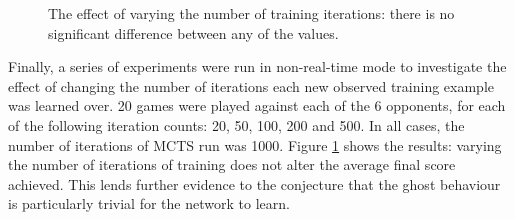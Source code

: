 \begin{figure}
\centering
{}
\caption[The effect of varying the number of training iterations]{The effect of varying the number of training iterations: there is no significant difference between any of the values.}
\label{fig:resultsiterations}
\end{figure}



Finally, a series of experiments were run in non-real-time mode to investigate the effect of changing the number of iterations each new observed training example was learned over.  20 games were played against each of the 6 opponents, for each of the following iteration counts: 20, 50, 100, 200 and 500.  In all cases, the number of iterations of MCTS run was 1000.  Figure \ref{fig:resultsiterations} shows the results: varying the number of iterations of training does not alter the average final score achieved.  This lends further evidence to the conjecture that the ghost behaviour is particularly trivial for the network to learn.

